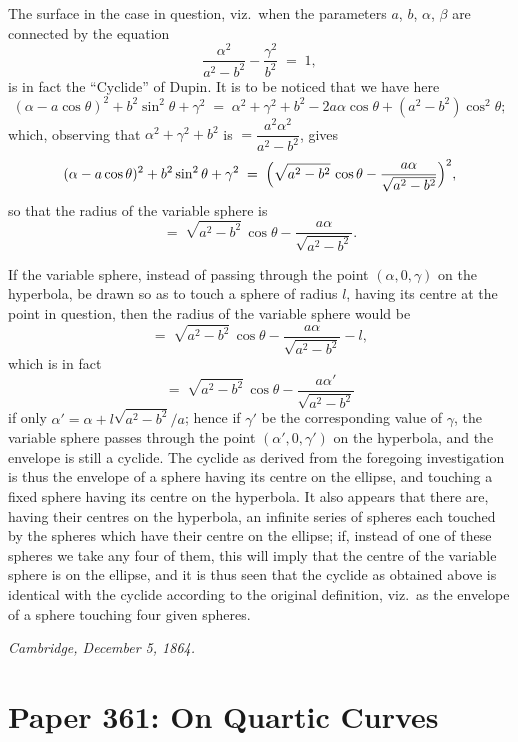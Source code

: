 \documentclass[11pt]{article}
\begin{document}
The surface in the case in question, viz.\ when the parameters $a$, $b$, $\alpha$, $\beta$ are connected by the equation
\[
\frac{\alpha^{2}}{a^{2} - b^{2}} - \frac{\gamma^{2}}{b^{2}} \;=\; 1,
\]
is in fact the ``Cyclide'' of Dupin. It is to be noticed that we have here
\[
(\alpha - a\cos\theta)^{2} + b^{2}\sin^{2}\theta + \gamma^{2} \;=\; \alpha^{2} + \gamma^{2} + b^{2} - 2 a\alpha\cos\theta + (a^{2} - b^{2})\cos^{2}\theta;
\]
which, observing that $\alpha^{2} + \gamma^{2} + b^{2}$ is $=\dfrac{a^{2}\alpha^{2}}{a^{2} - b^{2}}$, gives
\[
(\alpha - a\cos\theta)^{2} + b^{2}\sin^{2}\theta + \gamma^{2} \;=\; \Bigl(\sqrt{a^{2} - b^{2}}\,\cos\theta - \frac{a\alpha}{\sqrt{a^{2} - b^{2}}}\Bigr)^{2},
\]
so that the radius of the variable sphere is
\[
=\; \sqrt{a^{2} - b^{2}}\,\cos\theta - \frac{a\alpha}{\sqrt{a^{2} - b^{2}}}.
\]

If the variable sphere, instead of passing through the point $(\alpha, 0, \gamma)$ on the hyperbola, be drawn so as to touch a sphere of radius $l$, having its centre at the point in question, then the radius of the variable sphere would be
\[
=\; \sqrt{a^{2} - b^{2}}\,\cos\theta - \frac{a\alpha}{\sqrt{a^{2} - b^{2}}} - l,
\]
which is in fact
\[
=\; \sqrt{a^{2} - b^{2}}\,\cos\theta - \frac{a\alpha'}{\sqrt{a^{2} - b^{2}}}
\]
if only $\alpha' = \alpha + l \sqrt{a^{2} - b^{2}}/a$; hence if $\gamma'$ be the corresponding value of $\gamma$, the variable sphere passes through the point $(\alpha', 0, \gamma')$ on the hyperbola, and the envelope is still a cyclide. The cyclide as derived from the foregoing investigation is thus the envelope of a sphere having its centre on the ellipse, and touching a fixed sphere having its centre on the hyperbola. It also appears that there are, having their centres on the hyperbola, an infinite series of spheres each touched by the spheres which have their centre on the ellipse; if, instead of one of these spheres we take any four of them, this will imply that the centre of the variable sphere is on the ellipse, and it is thus seen that the cyclide as obtained above is identical with the cyclide according to the original definition, viz.\ as the envelope of a sphere touching four given spheres.

\medskip
\textit{Cambridge, December 5, 1864.}

\bigskip
\section*{Paper 361: On Quartic Curves}
\end{document}
